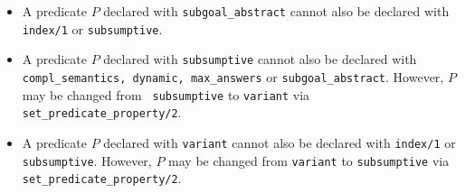 \begin{itemize}
%
%
%
\item A predicate $P$ declared with {\tt subgoal\_abstract} cannot also
  be declared with {\tt index/1} or {\tt subsumptive}.
%
\item A predicate $P$ declared with {\tt subsumptive} cannot also be
  declared with {\tt compl\_semantics, dynamic, max\_answers}
    or {\tt subgoal\_abstract}.  However, $P$ may be changed from {\tt
      subsumptive} to {\tt variant} via {\tt
      set\_predicate\_property/2}.
%
\item A predicate $P$ declared with {\tt variant} cannot also be
  declared with {\tt index/1} or {\tt subsumptive}. However, $P$ may be changed from
  {\tt variant} to {\tt subsumptive} via {\tt
    set\_predicate\_property/2}.

\end{itemize}

